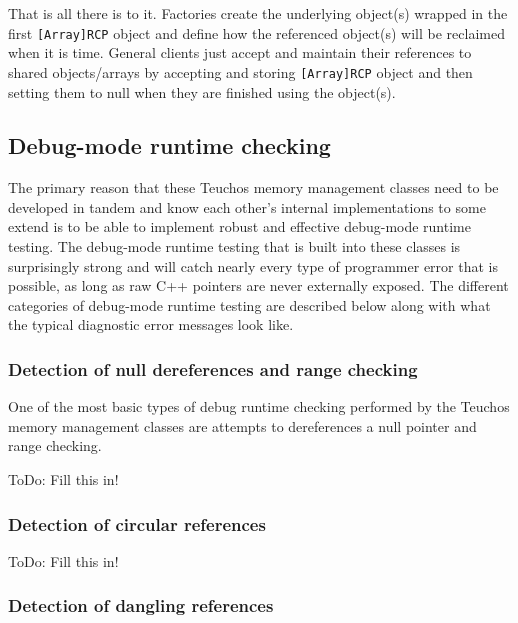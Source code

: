\documentclass[pdf,ps2pdf,11pt]{SANDreport}
\begin{document}
That is all there is to it.  Factories create the underlying object(s)
wrapped in the first {}\texttt{[Array]RCP} object and define how the
referenced object(s) will be reclaimed when it is time.  General
clients just accept and maintain their references to shared
objects/arrays by accepting and storing {}\texttt{[Array]RCP} object
and then setting them to null when they are finished using the
object(s).


%
{}\subsection{Debug-mode runtime checking}
\label{sec:debug-mode-runtime-checking}
%

The primary reason that these Teuchos memory management classes need
to be developed in tandem and know each other's internal
implementations to some extend is to be able to implement robust and
effective debug-mode runtime testing.  The debug-mode runtime testing
that is built into these classes is surprisingly strong and will catch
nearly every type of programmer error that is possible, as long as raw
C++ pointers are never externally exposed.  The different categories
of debug-mode runtime testing are described below along with what the
typical diagnostic error messages look like.


%
{}\subsubsection{Detection of null dereferences and range checking}
\label{sec:null-dereferences-range-checking}
%

One of the most basic types of debug runtime checking performed by the
Teuchos memory management classes are attempts to dereferences a null
pointer and range checking.

ToDo: Fill this in!


%
{}\subsubsection{Detection of circular references}
\label{sec:detection-circular-references}
%

ToDo: Fill this in!


%
{}\subsubsection{Detection of dangling references}
\label{sec:detection-dangling-references}
%
\end{document}

